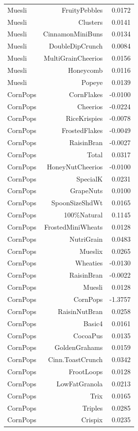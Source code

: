 \begin{longtable}{@{}lrr@{}}
Muesli & FruityPebbles & 0.0172 \\
Muesli & Clusters & 0.0141 \\
Muesli & CinnamonMiniBuns & 0.0134 \\
Muesli & DoubleDipCrunch & 0.0084 \\
Muesli & MultiGrainCheerios & 0.0156 \\
Muesli & Honeycomb & 0.0116 \\
Muesli & Popeye & 0.0139 \\
CornPops & CornFlakes & -0.0100 \\
CornPops & Cheerios & -0.0224 \\
CornPops & RiceKrispies & -0.0078 \\
CornPops & FrostedFlakes & -0.0049 \\
CornPops & RaisinBran & -0.0027 \\
CornPops & Total & 0.0317 \\
CornPops & HoneyNutCheerios & -0.0100 \\
CornPops & SpecialK & 0.0231 \\
CornPops & GrapeNuts & 0.0100 \\
CornPops & SpoonSizeShdWt & 0.0165 \\
CornPops & 100\%Natural & 0.1145 \\
CornPops & FrostedMiniWheats & 0.0128 \\
CornPops & NutriGrain & 0.0483 \\
CornPops & Mueslix & 0.0265 \\
CornPops & Wheaties & -0.0130 \\
CornPops & RaisinBran & -0.0022 \\
CornPops & Muesli & 0.0128 \\
CornPops & CornPops & -1.3757 \\
CornPops & RaisinNutBran & 0.0258 \\
CornPops & Basic4 & 0.0161 \\
CornPops & CocoaPus & 0.0135 \\
CornPops & GoldenGrahams & 0.0159 \\
CornPops & Cinn.ToastCrunch & 0.0342 \\
CornPops & FrootLoops & 0.0128 \\
CornPops & LowFatGranola & 0.0213 \\
CornPops & Trix & 0.0165 \\
CornPops & Triples & 0.0285 \\
CornPops & Crispix & 0.0235 \\

\end{longtable}
